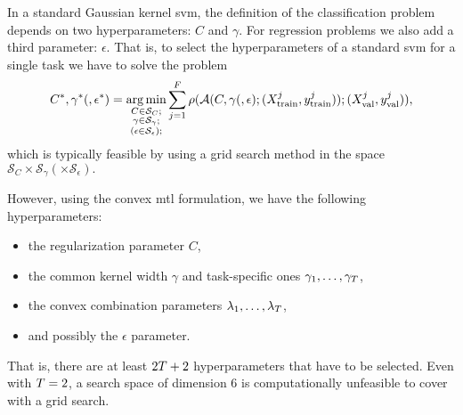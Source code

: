 %
In a standard Gaussian kernel \acrshort{svm}, the definition of the classification problem depends on two hyperparameters: $C$ and $\gamma$.
For regression problems we also add a third parameter: $\epsilon$. 
That is, to select the hyperparameters of a standard \acrshort{svm} for a single task we have to solve the problem
\begin{equation}
    \nonumber
    C^*, \gamma^* (, \epsilon^*) = \operatorname*{arg\min}_{\substack{C \in \mathcal{S}_C ; \\ \substack{\gamma \in \mathcal{S}_\gamma} ; \\ \left(\substack{\epsilon \in \mathcal{S}_\epsilon} \right); }}
     \sum_{j=1}^{F} \rho(\mathcal{A}(C, \gamma (, \epsilon); (X^j_\text{train}, y^j_\text{train})); (X^j_\text{val}, y^j_\text{val})) ,
\end{equation}
which is typically feasible by using a grid search method in the space $\mathcal{S}_{C} \times \mathcal{S}_{\gamma} (\times \mathcal{S}_{\epsilon}) .$
%

However, using the convex \acrshort{mtl} formulation, 
we have the following hyperparameters: 
\begin{itemize}
    \item the regularization parameter $C$,
    \item the common kernel width $\gamma$ and task-specific ones $\gamma_1, \ldots, \gamma_T$,
    \item the convex combination parameters $\lambda_1, \ldots, \lambda_T$,
    \item and possibly the $\epsilon$ parameter.
\end{itemize}
That is, there are at least $2T + 2$ hyperparameters that have to be selected. Even with $T=2$, a search space of dimension $6$ is computationally unfeasible to cover with a grid search.

